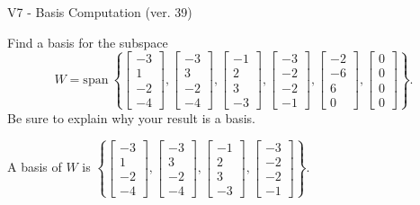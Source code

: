 \begin{exercise}
  \begin{exerciseTitle}V7 - Basis Computation (ver. 39)\end{exerciseTitle}
  \begin{exerciseStatement}
    Find a basis for the subspace 
\[W=\mathrm{span}\ \left\{\left[\begin{array}{r}
-3 \\
1 \\
-2 \\
-4
\end{array}\right] , \left[\begin{array}{r}
-3 \\
3 \\
-2 \\
-4
\end{array}\right] , \left[\begin{array}{r}
-1 \\
2 \\
3 \\
-3
\end{array}\right] , \left[\begin{array}{r}
-3 \\
-2 \\
-2 \\
-1
\end{array}\right] , \left[\begin{array}{r}
-2 \\
-6 \\
6 \\
0
\end{array}\right] , \left[\begin{array}{r}
0 \\
0 \\
0 \\
0
\end{array}\right]\right\}.\]
 Be sure to explain why your result is a basis.


  \end{exerciseStatement}
  \begin{exerciseAnswer}
   A basis of \(W\) is  \(\left\{\left[\begin{array}{r}
-3 \\
1 \\
-2 \\
-4
\end{array}\right] , \left[\begin{array}{r}
-3 \\
3 \\
-2 \\
-4
\end{array}\right] , \left[\begin{array}{r}
-1 \\
2 \\
3 \\
-3
\end{array}\right] , \left[\begin{array}{r}
-3 \\
-2 \\
-2 \\
-1
\end{array}\right]\right\}\).
  


  \end{exerciseAnswer}
\end{exercise}